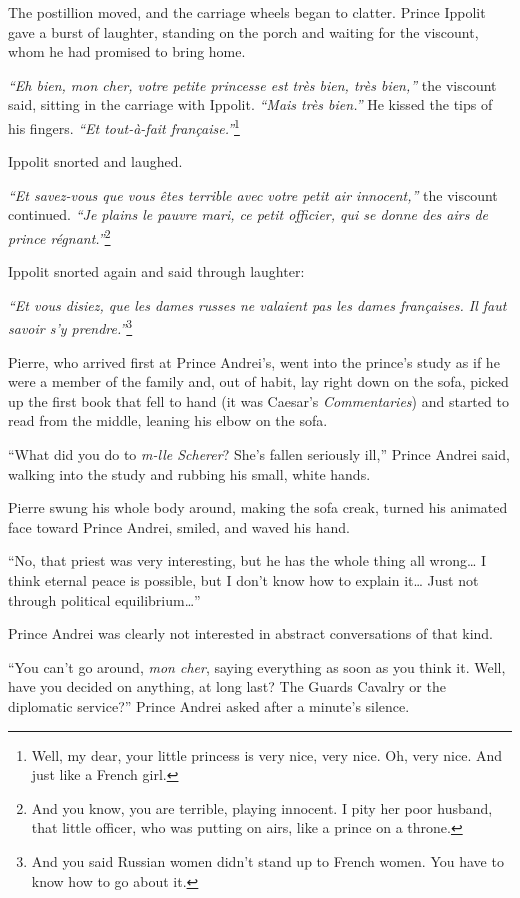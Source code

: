 The postillion moved, and the carriage wheels began to clatter. Prince
Ippolit gave a burst of laughter, standing on the porch and waiting
for the viscount, whom he had promised to bring home.

\textit{``Eh bien, mon cher, votre petite princesse est tr\`es bien,
  tr\`es bien,''} the viscount said, sitting in the carriage with
Ippolit. \textit{``Mais tr\`es bien.''} He kissed the tips of his
fingers. \textit{``Et tout-\`a-fait fran\c{c}aise.''}\footnote{Well,
  my dear, your little princess is very nice, very nice. Oh, very
  nice. And just like a French girl.}

Ippolit snorted and laughed.

\textit{``Et savez-vous que vous \^etes terrible avec votre petit air
  innocent,''} the viscount continued. \textit{``Je plains le pauvre
  mari, ce petit officier, qui se donne des airs de prince
  r\'egnant.''}\footnote{And you know, you are terrible, playing
  innocent. I pity her poor husband, that little officer, who was
  putting on airs, like a prince on a throne.}

Ippolit snorted again and said through laughter:

\textit{``Et vous disiez, que les dames russes ne valaient pas les
  dames fran\c{c}aises. Il faut savoir s'y prendre.''}\footnote{And
  you said Russian women didn't stand up to French women. You have to
  know how to go about it.}

Pierre, who arrived first at Prince Andrei's, went into the prince's
study as if he were a member of the family and, out of habit, lay
right down on the sofa, picked up the first book that fell to hand (it
was Caesar's \textit{Commentaries}) and started to read from the
middle, leaning his elbow on the sofa.

``What did you do to \textit{m-lle Scherer}? She's fallen seriously
ill,'' Prince Andrei said, walking into the study and rubbing his
small, white hands.

Pierre swung his whole body around, making the sofa creak, turned his
animated face toward Prince Andrei, smiled, and waved his hand.

``No, that priest was very interesting, but he has the whole thing all
wrong\ldots{} I think eternal peace is possible, but I don't know how
to explain it\ldots{} Just not through political equilibrium\ldots{}''

Prince Andrei was clearly not interested in abstract conversations of
that kind.

``You can't go around, \textit{mon cher}, saying everything as soon as
you think it. Well, have you decided on anything, at long last? The
Guards Cavalry or the diplomatic service?'' Prince Andrei asked after
a minute's silence.

